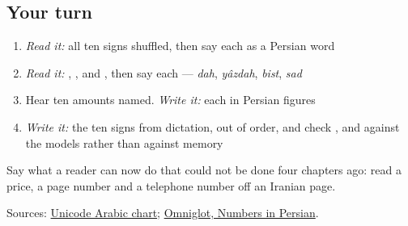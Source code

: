 \subsection*{Your turn}
\begin{enumerate}
\raggedright
  \item \emph{Read it:} all ten signs shuffled, then say each as a Persian word
  \item \emph{Read it:} \textbf{}, \textbf{}, \textbf{} and \textbf{}, then say each — \emph{dah}, \emph{yâzdah}, \emph{bist}, \emph{sad}
  \item Hear ten amounts named. \emph{Write it:} each in Persian figures
  \item \emph{Write it:} the ten signs from dictation, out of order, and check \textbf{}, \textbf{} and \textbf{} against the models rather than against memory
\end{enumerate}

Say what a reader can now do that could not be done four chapters ago: read a price, a page number and a telephone number off an Iranian page.

\begin{tcolorbox}[breakable,colback=teal!4,colframe=teal!35!black,title={Before you move on}]
Sources: \href{https://www.unicode.org/charts/PDF/U0600.pdf}{Unicode Arabic chart}; \href{https://www.omniglot.com/language/numbers/persian.htm}{Omniglot, Numbers in Persian}.
\end{tcolorbox}
